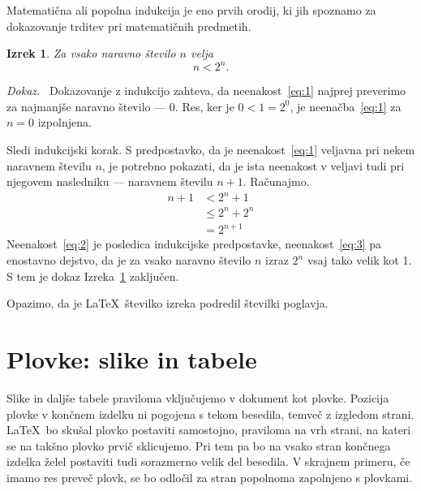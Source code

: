 \documentclass[a4paper, 12pt]{book}
\newtheorem{izrek}{Izrek}[chapter]
\newenvironment{dokaz}{\emph{Dokaz.}\ }{\hspace{\fill}{$\Box$}}
\begin{document}
Matematična ali popolna indukcija je eno prvih orodij, ki jih spoznamo za dokazovanje trditev pri matematičnih predmetih.
\begin{izrek}
\label{iz:1}
Za vsako naravno število $n$ velja
\begin{equation}
n < 2^n.
\label{eq:1}
\end{equation}
\end{izrek}
\begin{dokaz}
Dokazovanje z indukcijo zahteva, da neenakost~\eqref{eq:1} najprej preverimo za najmanjše naravno število --- $0$. Res, ker je $0 < 1 = 2^0$, je neenačba~\eqref{eq:1} za $n=0$ izpolnjena.

Sledi indukcijski korak. S predpostavko, da je neenakost~\eqref{eq:1} veljavna pri nekem naravnem številu $n$, je potrebno pokazati, da je ista neenakost v veljavi tudi pri njegovem nasledniku --- naravnem številu $n+1$. Računajmo.
\begin{align}
n+1 &< 2^n + 1  \label{eq:2}\\
    &\le 2^n + 2^n \label{eq:3}\\
    &= 2^{n+1} \nonumber
\end{align}
Neenakost~\eqref{eq:2} je posledica indukcijske predpostavke, neenakost~\eqref{eq:3} pa enostavno dejstvo, da je za vsako naravno število $n$ izraz $2^n$ vsaj tako velik kot 1. S tem je dokaz Izreka~\ref{iz:1} zaključen.
\end{dokaz}

Opazimo, da je \LaTeX\ številko izreka podredil številki poglavja.



\chapter{Plovke: slike in tabele}
\label{ch:plovke}

Slike in daljše tabele praviloma vključujemo v dokument kot plovke. Pozicija plovke v končnem izdelku ni pogojena s tekom besedila, temveč z izgledom strani. \LaTeX\ bo skušal plovko postaviti samostojno, praviloma na vrh strani, na kateri se na takšno plovko prvič sklicujemo. Pri tem pa bo na vsako stran končnega izdelka želel postaviti tudi sorazmerno velik del besedila. V skrajnem primeru, če imamo res preveč plovk, se bo odločil za stran popolnoma zapolnjeno s plovkami.
\end{document}

